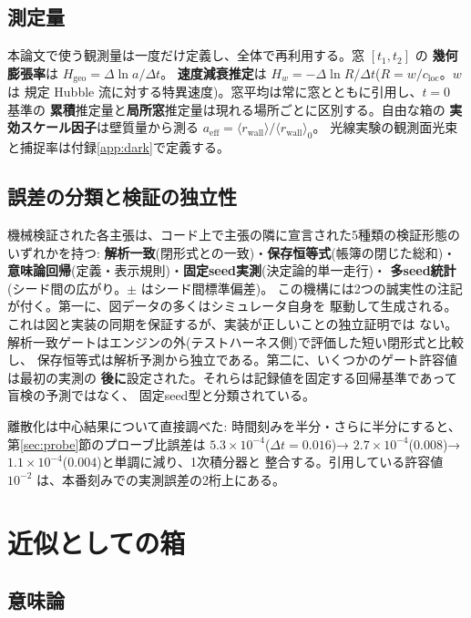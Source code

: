 \documentclass[a4paper,10pt,twocolumn]{ltjsarticle}
\begin{document}
\subsection{測定量}

本論文で使う観測量は一度だけ定義し、全体で再利用する。窓 $[t_1,t_2]$ の
\textbf{幾何膨張率}は $H_{\mathrm{geo}}=\Delta\ln a/\Delta t$。
\textbf{速度減衰推定}は $H_w=-\Delta\ln R/\Delta t$($R=w/c_{\mathrm{loc}}$。$w$ は
規定 Hubble 流に対する特異速度)。窓平均は常に窓とともに引用し、$t=0$ 基準の
\textbf{累積}推定量と\textbf{局所窓}推定量は現れる場所ごとに区別する。自由な箱の
\textbf{実効スケール因子}は壁質量から測る
$a_{\mathrm{eff}}=\langle r_{\mathrm{wall}}\rangle/\langle r_{\mathrm{wall}}\rangle_0$。
光線実験の観測面光束と捕捉率は付録\ref{app:dark}で定義する。

\subsection{誤差の分類と検証の独立性}
\label{sec:taxonomy}

機械検証された各主張は、コード上で主張の隣に宣言された5種類の検証形態のいずれかを持つ:
\textbf{解析一致}(閉形式との一致)・\textbf{保存恒等式}(帳簿の閉じた総和)・
\textbf{意味論回帰}(定義・表示規則)・\textbf{固定seed実測}(決定論的単一走行)・
\textbf{多seed統計}(シード間の広がり。$\pm$ はシード間標準偏差)。
この機構には2つの誠実性の注記が付く。第一に、図データの多くはシミュレータ自身を
駆動して生成される。これは図と実装の同期を保証するが、実装が正しいことの独立証明では
ない。解析一致ゲートはエンジンの外(テストハーネス側)で評価した短い閉形式と比較し、
保存恒等式は解析予測から独立である。第二に、いくつかのゲート許容値は最初の実測の
\textbf{後に}設定された。それらは記録値を固定する回帰基準であって盲検の予測ではなく、
固定seed型と分類されている。

離散化は中心結果について直接調べた: 時間刻みを半分・さらに半分にすると、
第\ref{sec:probe}節のプローブ比誤差は $5.3\times10^{-4}$($\Delta t=0.016$)→
$2.7\times10^{-4}$($0.008$)→ $1.1\times10^{-4}$($0.004$)と単調に減り、1次積分器と
整合する。引用している許容値 $10^{-2}$ は、本番刻みでの実測誤差の2桁上にある。

\section{近似としての箱}
\label{sec:box}

\subsection{意味論}
\label{sec:semantics}
\end{document}

